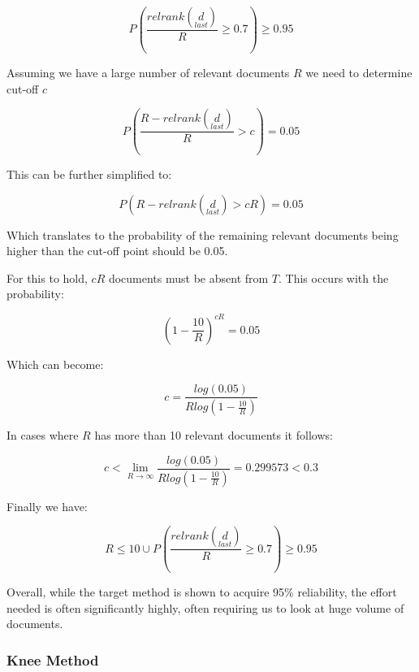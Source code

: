 \begin{equation}
	  P(\frac{relrank(\underset{last}{d})}{R} \geqslant 0.7) \geqslant 0.95
\end{equation}


Assuming we have a large number of relevant documents $R$ we need to determine cut-off $c$

\begin{equation}
	  P( \frac{R - relrank(\underset{last}{d})}{R} > c) = 0.05
\end{equation}

This can be further simplified to:

\begin{equation}
	  P(R - relrank(\underset{last}{d}) > cR) = 0.05
\end{equation}

Which translates to the probability of the remaining relevant documents being higher than the cut-off point should be 0.05.

For this to hold, $cR$ documents must be absent from $T$. This occurs with the probability:


\begin{equation}
	  \left(1 - \frac{10}{R}\right)^{cR} = 0.05
\end{equation}

Which can become:

\begin{equation}
	  c = \frac{log(0.05)}{R log(1 - \frac{10}{R})}
\end{equation}


In cases where $R$ has more than 10 relevant documents it follows:


\begin{equation}
	  c < \lim_{R \to \infty} \frac{log(0.05)}{R log (1 - \frac{10}{R})} = 0.299573 < 0.3
\end{equation}

Finally we have:

\begin{equation}
	 R \leq 10 \cup P(\frac{relrank(\underset{last}{d})}{R} \geq 0.7) 	\geq 0.95
\end{equation}

Overall, while the target method is shown to acquire 95\% reliability, the effort needed is often significantly highly, often requiring us to look at huge volume of documents.

\subsubsection{Knee Method}

